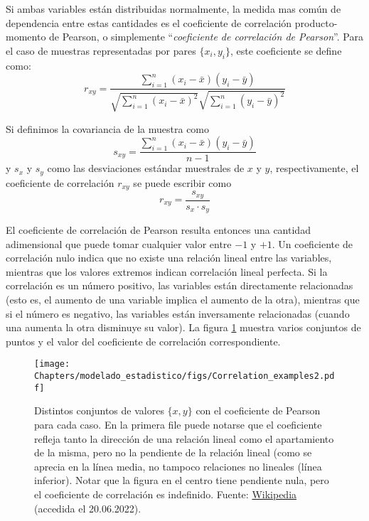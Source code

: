 Si ambas variables están distribuidas normalmente, la medida mas común de dependencia entre estas cantidades es el coeficiente de correlación producto-momento de Pearson, o simplemente ``\textit{coeficiente de correlación de Pearson}''. Para el caso de muestras representadas por pares $\{x_i, y_i\}$, este coeficiente se define como:
\[ r_{xy} =\frac{\sum\limits_{i=1}^n{(x_i - \bar{x})(y_i - \bar{y})}} {\sqrt{\sum\limits_{i=1}^n(x_i - \bar{x})^2} \sqrt{\sum\limits_{i=1}^n(y_i - \bar{y})^2}}  \]

Si definimos la covariancia de la muestra como
\[ s_{xy} = \frac{\sum\limits_{i=1}^n {(x_i - \bar{x}) (y_i - \bar{y})}} {n - 1}  \]
y $s_x$ y $s_y$ como las desviaciones estándar muestrales de $x$ y $y$, respectivamente, el coeficiente de correlación $r_{xy}$ se puede escribir como
\[ r_{xy} = \frac{s_{xy}}{s_x \cdot s_y}  \]

El coeficiente de correlación de Pearson resulta entonces una cantidad adimensional que puede tomar cualquier valor entre $-1$ y $+1$. Un coeficiente de correlación nulo indica que no existe una relación lineal entre las variables, mientras que los valores extremos indican correlación lineal perfecta. Si la correlación es un número positivo, las variables están directamente relacionadas (esto es, el aumento de una variable implica el aumento de la otra), mientras que si el número es negativo, las variables están inversamente relacionadas (cuando una aumenta la otra disminuye su valor). La figura \ref{fig:me-pearson} muestra varios conjuntos de puntos y el valor del coeficiente de correlación correspondiente. 

\begin{figure}[t]
 \centering
 \texttt{[image: Chapters/modelado\_estadistico/figs/Correlation\_examples2.pdf]}
 \caption{Distintos conjuntos de valores $\{x, y\}$ con el coeficiente de Pearson para cada caso. En la primera file puede notarse que el coeficiente refleja tanto la dirección de una relación lineal como el apartamiento de la misma, pero no la pendiente de la relación lineal (como se aprecia en la línea media, no tampoco relaciones no lineales (línea inferior). Notar que la figura en el centro tiene pendiente nula, pero el coeficiente de correlación es indefinido. Fuente: \href{https://commons.wikimedia.org/w/index.php?curid=15165296}{Wikipedia} (accedida el 20.06.2022). }
 \label{fig:me-pearson}
\end{figure}

